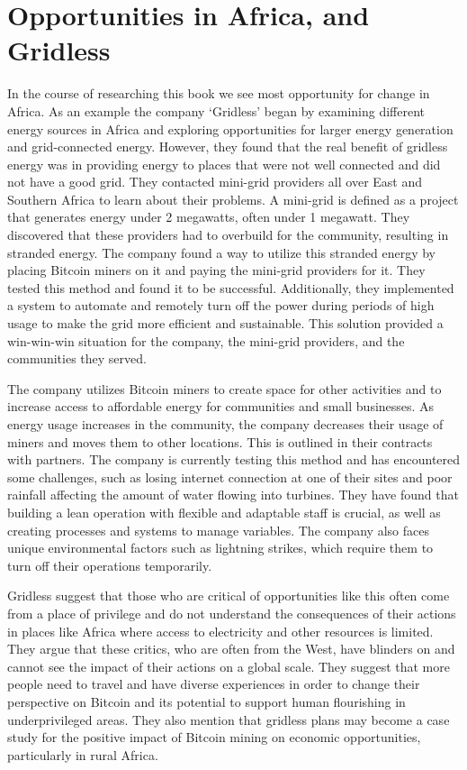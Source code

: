 \section{Opportunities in Africa, and Gridless}
In the course of researching this book we see most opportunity for change in Africa. As an example the company `Gridless' began by examining different energy sources in Africa and exploring opportunities for larger energy generation and grid-connected energy. However, they found that the real benefit of gridless energy was in providing energy to places that were not well connected and did not have a good grid. They contacted mini-grid providers all over East and Southern Africa to learn about their problems. A mini-grid is defined as a project that generates energy under 2 megawatts, often under 1 megawatt. They discovered that these providers had to overbuild for the community, resulting in stranded energy. The company found a way to utilize this stranded energy by placing Bitcoin miners on it and paying the mini-grid providers for it. They tested this method and found it to be successful. Additionally, they implemented a system to automate and remotely turn off the power during periods of high usage to make the grid more efficient and sustainable. This solution provided a win-win-win situation for the company, the mini-grid providers, and the communities they served.\par
The company utilizes Bitcoin miners to create space for other activities and to increase access to affordable energy for communities and small businesses. As energy usage increases in the community, the company decreases their usage of miners and moves them to other locations. This is outlined in their contracts with partners. The company is currently testing this method and has encountered some challenges, such as losing internet connection at one of their sites and poor rainfall affecting the amount of water flowing into turbines. They have found that building a lean operation with flexible and adaptable staff is crucial, as well as creating processes and systems to manage variables. The company also faces unique environmental factors such as lightning strikes, which require them to turn off their operations temporarily.\par
Gridless suggest that those who are critical of opportunities like this often come from a place of privilege and do not understand the consequences of their actions in places like Africa where access to electricity and other resources is limited. They argue that these critics, who are often from the West, have blinders on and cannot see the impact of their actions on a global scale. They suggest that more people need to travel and have diverse experiences in order to change their perspective on Bitcoin and its potential to support human flourishing in underprivileged areas. They also mention that gridless plans may become a case study for the positive impact of Bitcoin mining on economic opportunities, particularly in rural Africa.
